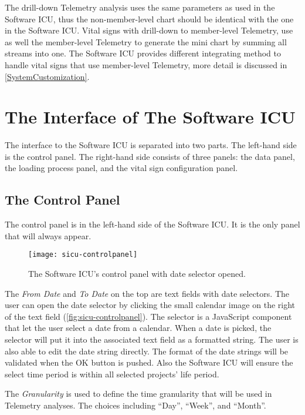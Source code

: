 The drill-down Telemetry analysis uses the same parameters as used in the Software ICU, thus the non-member-level chart should be identical with the one in the Software ICU. Vital signs with drill-down to member-level Telemetry, use as well the member-level Telemetry to generate the mini chart by summing all streams into one. The Software ICU provides different integrating method to handle vital signs that use member-level Telemetry, more detail is discussed in \autoref{SystemCustomization}.


\section{The Interface of The Software ICU}

The interface to the Software ICU is separated into two parts. The left-hand side is the control panel. The right-hand side consists of three panels: the data panel, the loading process panel, and the vital sign configuration panel. 

\subsection{The Control Panel}

The control panel is in the left-hand side of the Software ICU. It is the only panel that will always appear.

\begin{figure}[htbp]
   \centering
   \texttt{[image: sicu-controlpanel]}
   \caption{The Software ICU's control panel with date selector opened.}
   \label{fig:sicu-controlpanel}
\end{figure}

The {\it From Date} and {\it To Date} on the top are text fields with date selectors. The user can open the date selector by clicking the small calendar image on the right of the text field (\autoref{fig:sicu-controlpanel}). The selector is a JavaScript component that let the user select a date from a calendar. When a date is picked, the selector will put it into the associated text field as a formatted string. The user is also able to edit the date string directly. The format of the date strings will be validated when the OK button is pushed. Also the Software ICU will ensure the select time period is within all selected projects' life period.

The {\it Granularity} is used to define the time granularity that will be used in Telemetry analyses. The choices including ``Day'', ``Week'', and ``Month''.

